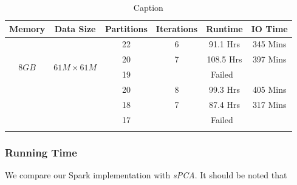 \documentclass[10pt,conference,letterpaper]{IEEEtran}
\begin{document}
\begin{table}[!htbp]
    \centering
    \begin{tabular}{|c|c|c|c|c|c|}
    \hline
    Memory &Data Size &Partitions &Iterations &Runtime &IO Time \\
    \hline
    \multirow{4}{17pt}{$8GB$}  & \multirow{4}{7em}{$61M \times 61M$} &22  &6		&91.1 Hrs   	  &345 Mins\\
    \cline{3-6}
         & & 20 &7		&108.5 Hrs   	  &397 Mins\\
    \cline{3-6}
         & & 19 &\multicolumn{3}{|c|}{Failed} \\
    \hline
    
    \multirow{4}{17pt}{$12GB$}  & \multirow{4}{7em}{$61M \times 61M$} &20  &8		&99.3 Hrs   	  &405 Mins\\
    \cline{3-6}
         & & 18 &7		&87.4 Hrs   	  &317 Mins\\
    \cline{3-6}
         & & 17 &\multicolumn{3}{|c|}{Failed} \\
    \hline
    \multicolumn{6}{c}{}
    \end{tabular}
    \caption{Caption}
    \label{tab:twitter_partition}
\end{table}

\subsubsection{Running Time}
We compare our Spark implementation with \textit{sPCA}. It should be noted that 




%
%
\end{document}
